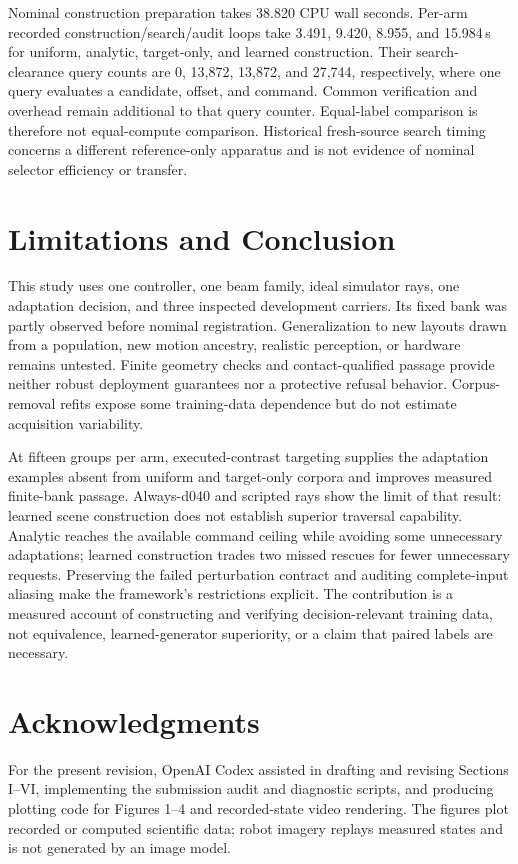 \documentclass[letterpaper,10pt,conference]{ieeeconf}
\begin{document}
Nominal construction preparation takes 38.820 CPU wall seconds. Per-arm
recorded construction/search/audit loops take 3.491, 9.420, 8.955, and
15.984\,s for uniform, analytic, target-only, and learned construction.
Their search-clearance query counts are 0, 13,872, 13,872, and 27,744,
respectively, where one query evaluates a candidate, offset, and command.
Common verification and overhead remain additional to that query counter.
Equal-label comparison is therefore not equal-compute comparison. Historical
fresh-source search timing concerns a different reference-only apparatus
and is not evidence of nominal selector efficiency or transfer.

\section{Limitations and Conclusion}
This study uses one controller, one beam family, ideal simulator rays, one
adaptation decision, and three inspected development carriers. Its fixed
bank was partly observed before nominal registration. Generalization to
new layouts drawn from a population, new motion ancestry, realistic
perception, or hardware remains untested. Finite geometry checks and
contact-qualified passage provide neither robust deployment guarantees
nor a protective refusal behavior. Corpus-removal refits expose some
training-data dependence but do not estimate acquisition variability.

At fifteen groups per arm, executed-contrast targeting supplies the
adaptation examples absent from uniform and target-only corpora and
improves measured finite-bank passage. Always-d040 and scripted rays
show the limit of that result: learned scene construction does not
establish superior traversal capability. Analytic reaches the available
command ceiling while avoiding some unnecessary adaptations; learned
construction trades two missed rescues for fewer unnecessary requests.
Preserving the failed perturbation contract and auditing complete-input
aliasing make the framework's restrictions explicit. The contribution
is a measured account of constructing and verifying decision-relevant
training data, not equivalence, learned-generator superiority, or a
claim that paired labels are necessary.

\section*{Acknowledgments}
For the present revision, OpenAI Codex assisted in drafting and revising Sections I--VI, implementing
the submission audit and diagnostic scripts, and producing plotting code
for Figures 1--4 and recorded-state video rendering. The figures plot
recorded or computed scientific data; robot imagery replays measured
states and is not generated by an image model.
\end{document}

